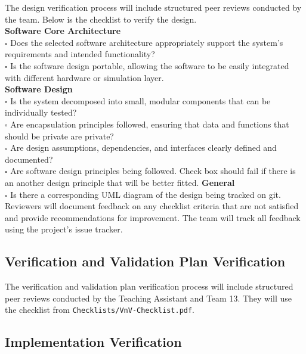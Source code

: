 \documentclass[12pt, titlepage]{article}
\begin{document}
The design verification process will include structured peer reviews conducted
by the team. Below is the checklist to verify the design.\\
\newline
\textbf{Software Core Architecture} \\
$\square$ Does the selected software architecture appropriately support the
system's requirements and intended functionality? \\
$\square$ Is the software design portable, allowing the software to be easily
integrated with different hardware or simulation layer. \\
\newline
\newline
\textbf{Software Design} \\
$\square$ Is the system decomposed into small, modular components that can be
individually tested? \\
$\square$ Are encapsulation principles followed, ensuring that data and
functions that should be private are private? \\
$\square$ Are design assumptions, dependencies, and interfaces clearly defined
and documented? \\
$\square$ Are software design principles being followed. Check box should fail
if there is an another design principle that will be better fitted.
\newline
\newline
\textbf{General} \\
$\square$ Is there a corresponding UML diagram of the design being tracked on
git. \\

Reviewers will document feedback on any checklist criteria that are not
satisfied and provide recommendations for improvement. The team will track all 
feedback using the project's issue tracker.

\subsection{Verification and Validation Plan Verification}
\label{sec:vnv_plan_verification}

The verification and validation plan verification process will include
structured peer reviews conducted by the Teaching Assistant and Team 13.
They will use the checklist from \texttt{Checklists/VnV-Checklist.pdf}.

\subsection{Implementation Verification}\label{sec:implementation_verification}
\end{document}
